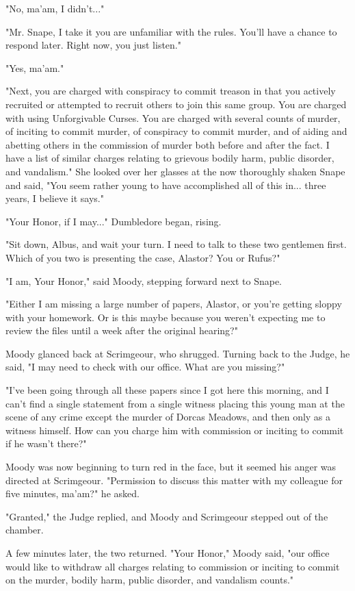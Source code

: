 \documentclass[a4paper,11pt]{article}
\begin{document}
"No, ma'am, I didn't..."

"Mr. Snape, I take it you are unfamiliar with the rules. You'll have a chance to respond later. Right now, you just listen."

"Yes, ma'am."

"Next, you are charged with conspiracy to commit treason in that you actively recruited or attempted to recruit others to join this same group. You are charged with using Unforgivable Curses. You are charged with several counts of murder, of inciting to commit murder, of conspiracy to commit murder, and of aiding and abetting others in the commission of murder both before and after the fact. I have a list of similar charges relating to grievous bodily harm, public disorder, and vandalism." She looked over her glasses at the now thoroughly shaken Snape and said, "You seem rather young to have accomplished all of this in... three years, I believe it says."

"Your Honor, if I may..." Dumbledore began, rising.

"Sit down, Albus, and wait your turn. I need to talk to these two gentlemen first. Which of you two is presenting the case, Alastor? You or Rufus?"

"I am, Your Honor," said Moody, stepping forward next to Snape.

"Either I am missing a large number of papers, Alastor, or you're getting sloppy with your homework. Or is this maybe because you weren't expecting me to review the files until a week after the original hearing?"

Moody glanced back at Scrimgeour, who shrugged. Turning back to the Judge, he said, "I may need to check with our office. What are you missing?"

"I've been going through all these papers since I got here this morning, and I can't find a single statement from a single witness placing this young man at the scene of any crime except the murder of Dorcas Meadows, and then only as a witness himself. How can you charge him with commission or inciting to commit if he wasn't there?"

Moody was now beginning to turn red in the face, but it seemed his anger was directed at Scrimgeour. "Permission to discuss this matter with my colleague for five minutes, ma'am?" he asked.

"Granted," the Judge replied, and Moody and Scrimgeour stepped out of the chamber.

A few minutes later, the two returned. "Your Honor," Moody said, "our office would like to withdraw all charges relating to commission or inciting to commit on the murder, bodily harm, public disorder, and vandalism counts."
\end{document}
